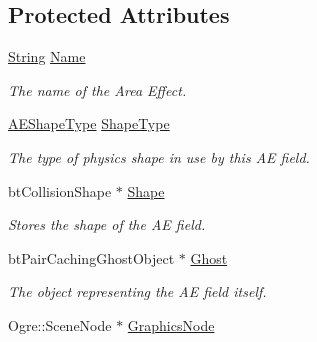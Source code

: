 \subsection*{Protected Attributes}
\begin{DoxyCompactItemize}
\item 
\hypertarget{classphys_1_1AreaEffect_a1cf5a878eb22b30a166f5b065944a986}{
\hyperlink{namespacephys_aa03900411993de7fbfec4789bc1d392e}{String} \hyperlink{classphys_1_1AreaEffect_a1cf5a878eb22b30a166f5b065944a986}{Name}}
\label{d4/d55/classphys_1_1AreaEffect_a1cf5a878eb22b30a166f5b065944a986}

\begin{DoxyCompactList}\small\item\em The name of the Area Effect. \item\end{DoxyCompactList}\item 
\hypertarget{classphys_1_1AreaEffect_a1465c564cc8e32b8a530881c5db70b88}{
\hyperlink{classphys_1_1AreaEffect_a99b8746c43eac266d48ad613110dc6f9}{AEShapeType} \hyperlink{classphys_1_1AreaEffect_a1465c564cc8e32b8a530881c5db70b88}{ShapeType}}
\label{d4/d55/classphys_1_1AreaEffect_a1465c564cc8e32b8a530881c5db70b88}

\begin{DoxyCompactList}\small\item\em The type of physics shape in use by this AE field. \item\end{DoxyCompactList}\item 
\hypertarget{classphys_1_1AreaEffect_af8189f9e8dc4bf04f44550918e0ee117}{
btCollisionShape $\ast$ \hyperlink{classphys_1_1AreaEffect_af8189f9e8dc4bf04f44550918e0ee117}{Shape}}
\label{d4/d55/classphys_1_1AreaEffect_af8189f9e8dc4bf04f44550918e0ee117}

\begin{DoxyCompactList}\small\item\em Stores the shape of the AE field. \item\end{DoxyCompactList}\item 
\hypertarget{classphys_1_1AreaEffect_ae730c591bf929404f337d71d4119bde8}{
btPairCachingGhostObject $\ast$ \hyperlink{classphys_1_1AreaEffect_ae730c591bf929404f337d71d4119bde8}{Ghost}}
\label{d4/d55/classphys_1_1AreaEffect_ae730c591bf929404f337d71d4119bde8}

\begin{DoxyCompactList}\small\item\em The object representing the AE field itself. \item\end{DoxyCompactList}\item 
\hypertarget{classphys_1_1AreaEffect_a7fbb785d7357cc7eac68dc94bb72c18a}{
Ogre::SceneNode $\ast$ \hyperlink{classphys_1_1AreaEffect_a7fbb785d7357cc7eac68dc94bb72c18a}{GraphicsNode}}
\label{d4/d55/classphys_1_1AreaEffect_a7fbb785d7357cc7eac68dc94bb72c18a}


\end{DoxyCompactItemize}
